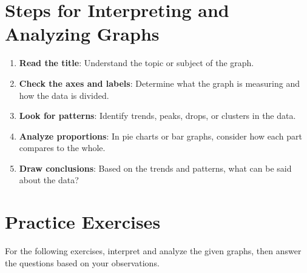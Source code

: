 \section*{Steps for Interpreting and Analyzing Graphs}

\begin{enumerate}
    \item \textbf{Read the title}: Understand the topic or subject of the graph.
    \item \textbf{Check the axes and labels}: Determine what the graph is measuring and how the data is divided.
    \item \textbf{Look for patterns}: Identify trends, peaks, drops, or clusters in the data.
    \item \textbf{Analyze proportions}: In pie charts or bar graphs, consider how each part compares to the whole.
    \item \textbf{Draw conclusions}: Based on the trends and patterns, what can be said about the data?
\end{enumerate}

\section*{Practice Exercises}

For the following exercises, interpret and analyze the given graphs, then answer the questions based on your observations.

